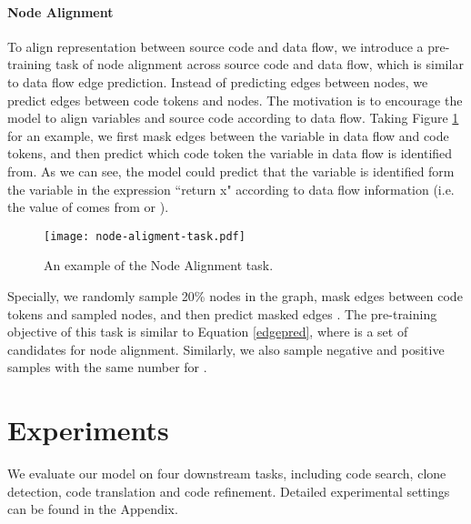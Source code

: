 \documentclass{article} \usepackage{iclr2021_conference,times}
\begin{document}
\paragraph{Node Alignment}
To align representation between source code and data flow, we introduce a pre-training task of node alignment across source code and data flow, which is similar to data flow edge prediction. 
Instead of predicting edges between nodes, we predict edges between code tokens and nodes.
The motivation is to encourage the model to align variables and source code according to data flow. 
Taking  Figure \ref{figure-node-alignment-task} for an example, we first mask edges between the variable  in data flow and code tokens, and then predict which code token the variable  in data flow is identified from. As we can see, the model could predict that the variable  is identified form the variable  in the expression ``return x" according to data flow information (i.e. the value of  comes from  or ).
\begin{figure}[h]
\begin{center}
		\texttt{[image: node-aligment-task.pdf]}
		\caption{An example of the Node Alignment task.}
		\label{figure-node-alignment-task}
	\end{center}
	\vskip -0.1in
\end{figure}

Specially, we randomly sample 20\% nodes  in the graph, mask edges between code tokens and sampled nodes, and then predict masked edges . The pre-training objective of this task is similar to Equation \ref{edgepred}, where  is a set of candidates for node alignment. Similarly, we also sample negative and positive samples with the same number for .







\section{Experiments}
\label{experiments}


We evaluate our model on four downstream tasks, including code search, clone detection, code translation and code refinement.
Detailed experimental settings can be found in the Appendix.
\end{document}
